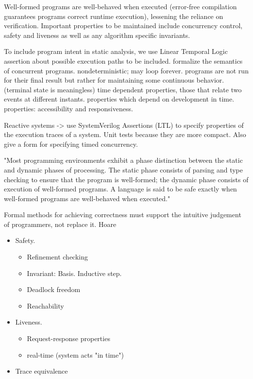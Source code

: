 Well-formed programs are well-behaved when executed
(error-free compilation guarantees programs 
correct runtime execution), lessening
the reliance on verification.  Important properties to be maintained
include concurrency control, safety and liveness as well as any
algorithm specific invariants.

To include program intent in static analysis, we use Linear Temporal Logic assertion
about possible execution paths to be included.
formalize the semantics of concurrent programs.
nondeterministic; may loop forever.
programs are not run for their final result but rather for maintaining some
continuous behavior. (terminal state is meaningless)
time dependent properties, those that relate two events at different instants.
properties which depend on development in time.
properties: accessibility and responsiveness.

Reactive systems -> use SystemVerilog Assertions (LTL) to specify properties of the execution traces of a system.
Unit tests because they are more compact.
Also give a form for specifying timed concurrency.

"Most programming environments exhibit a phase distinction between the static and
dynamic phases of processing.  The static phase consists of parsing and type checking
to ensure that the program is well-formed; the dynamic phase consists of execution of
well-formed programs.  A language is said to be safe exactly when well-formed
programs are well-behaved when executed."

Formal methods for achieving correctness must support the intuitive
judgement of programmers, not replace it.  Hoare

\begin{itemize}
\item Safety.
\begin{itemize}
\setlength\itemsep{-0.5em}
\item Refinement checking
\item Invariant:  Basis.  Inductive step.
\item Deadlock freedom
\item Reachability
\end{itemize}
\item Liveness.
\begin{itemize}
\setlength\itemsep{-0.5em}
\item Request-response properties
\item real-time (system acts "in time")
\end{itemize}
\item Trace equivalence
\end{itemize}

